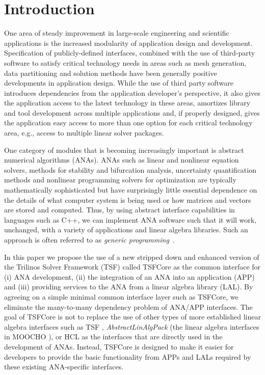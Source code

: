 \section{Introduction}

One area of steady improvement in large-scale engineering and
scientific applications is the increased modularity of application
design and development.  Specification of publicly-defined interfaces,
combined with the use of third-party software to satisfy critical
technology needs in areas such as mesh generation, data partitioning
and solution methods have been generally positive developments in
application design.  While the use of third party software introduces
dependencies from the application developer's perspective, it also
gives the application access to the latest technology in these areas,
amortizes library and tool development across multiple applications
and, if properly designed, gives the application easy access to more
than one option for each critical technology area, e.g., access to
multiple linear solver packages.

One category of modules that is becoming
increasingly important is abstract numerical algorithms (ANAs).  ANAs
such as linear and nonlinear equation solvers,
methods for stability and bifurcation analysis,
uncertainty quantification methods and nonlinear programming solvers
for optimization are typically mathematically 
sophisticated but have surprisingly little essential dependence on the
details of what computer system is being used or how matrices and
vectors are stored and computed.  Thus, by using abstract
interface capabilities in languages such as C++, we can implement ANA
software such that it will work, unchanged, with a variety of
applications and linear algebra libraries.  Such an approach is often
referred to as {\it generic programming}~\cite{ref:boost_generic_programming}.

In this paper we propose the use of a new stripped down
and enhanced version of the
Trilinos Solver Framework (TSF) called TSFCore as the common interface
for (i) ANA development, (ii) the integration of an ANA into an
application (APP) and (iii) providing services to the ANA from a
linear algebra library (LAL).  By agreeing on a simple minimal common
interface layer such as TSFCore, we eliminate the many-to-many
dependency problem of ANA/APP interfaces.  The goal of TSFCore is not
to replace the use of other types of more established linear algebra
interfaces such as TSF \cite{ref:TSF}, \textit{AbstractLinAlgPack}
(the linear algebra interfaces in MOOCHO \cite{ref:moochouserguide}),
or HCL \cite{ref:hcl} as the interfaces that are directly used in the
development of ANAs.  Instead, TSFCore is designed to make it easier
for developers to provide the basic functionality from APPs and LALs
required by these existing ANA-specific interfaces.


